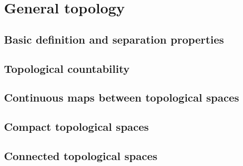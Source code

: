 
\chapter{General topology}

\section{Basic definition and separation properties}

\section{Topological countability}

\section{Continuous maps between topological spaces}

\section{Compact topological spaces}

\section{Connected topological spaces}
